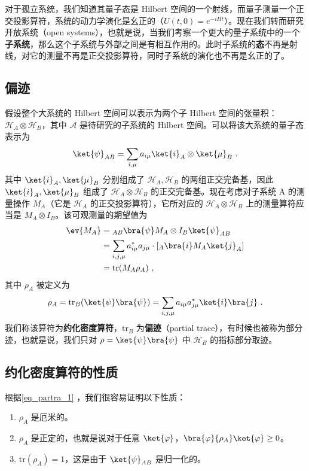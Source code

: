 

对于孤立系统，我们知道其量子态是 Hilbert 空间的一个射线，而量子测量一个正交投影算符，系统的动力学演化是幺正的（$U(t,0)=e^{-iHt}$）。现在我们转而研究开放系统（open systems），也就是说，当我们考察一个更大的量子系统中的一个\textbf{子系统}，那么这个子系统与外部之间是有相互作用的。此时子系统的\textbf{态}不再是射线，对它的测量不再是正交投影算符，同时子系统的演化也不再是幺正的了。
\subsection{偏迹}
假设整个大系统的 Hilbert 空间可以表示为两个子 Hilbert 空间的张量积：$\mathcal{H}_A\otimes \mathcal{H}_B$，其中 $\mathcal A$ 是待研究的子系统的 Hilbert 空间。可以将该大系统的量子态表示为
\begin{equation}
\ket{\psi}_{AB}=\sum_{i,\mu}a_{i\mu}\ket{i}_A\otimes \ket{\mu}_B~.
\end{equation}
其中 $\ket{i}_A,\ket{\mu}_B$ 分别组成了 $\mathcal{H}_A, \mathcal{H}_B$ 的两组正交完备基，因此 $\ket{i}_A,\ket{\mu}_B$ 组成了 $\mathcal{H}_A\otimes \mathcal{H}_B$ 的正交完备基。现在考虑对子系统 A 的测量操作 $M_A$（它是 $\mathcal H_A$ 的正交投影算符），它所对应的 $\mathcal{H}_A\otimes \mathcal{H}_B$ 上的测量算符应当是 $M_A\otimes I_B$。该可观测量的期望值为
\begin{equation}
\begin{aligned}
\ev{M_A}&={}_{AB}\bra{\psi}M_A\otimes I_B \ket{\psi}_{AB}\\
&=\sum_{i,j,\mu}a_{i\mu}^*a_{j\mu} \cdot [{}_A\bra{i} M_A \ket{j}_A]\\
&=\text{tr}(M_A \rho_A)~,
\end{aligned}
\end{equation}
其中 $\rho_A$ 被定义为
\begin{equation}\label{eq_partra_1}
\rho_A=\text{tr}_B(\ket{\psi}\bra{\psi})=\sum_{i,j,\mu}a_{i\mu}a_{j\mu}^*\ket{i}\bra{j}~.
\end{equation}
我们称该算符为\textbf{约化密度算符}，$\text{tr}_B$ 为\textbf{偏迹}（partial trace），有时候也被称为部分迹，也就是说，我们只对 $\rho=\ket{\psi}\bra{\psi}$ 中 $\mathcal{H}_B$ 的指标部分取迹。

\subsection{约化密度算符的性质}
根据\autoref{eq_partra_1} ，我们很容易证明以下性质：
\begin{enumerate}
\item $\rho_A$ 是厄米的。
\item $\rho_A$ 是正定的，也就是说对于任意 $\ket{\varphi}$，$\bra{\varphi}{\rho_A}\ket{\varphi}\ge 0$。
\item $\text{tr}(\rho_A)=1$，这是由于 $\ket{\psi}_{AB}$ 是归一化的。
\end{enumerate}

